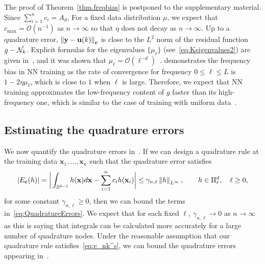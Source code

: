 \documentclass{article} %
\begin{document}
The proof of Theorem~\ref{thm.freqbias} is postponed to the supplementary material.  Since $\sum_{i=1}^n c_i = A_d$, For a fixed data distribution $\mu$, we expect that $c_{\text{max}} = \mathcal{O}(n^{-1})$ as $n\rightarrow\infty$ so that $\eta$ does not decay as $n \rightarrow \infty$. Up to a quadrature error, $\left\lVert\mathbf{y} - \mathbf{u}(k)\right\rVert_{\mathbf{c}}$ is close to the $L^2$ norm of the residual function $g - {\mathcal{N}}_k$. Explicit formulas for the eigenvalues $\{\mu_\ell\}$ (see~\cref{eq:Keigenvalues2}) are given in~\citep{basri}, and it was shown that $\mu_\ell=\mathcal{O}(\ell^{-d})$~\citep{bietti2019inductive}.  demonstrates the frequency bias in NN training as the rate of convergence for frequency $0\leq \ell\leq L$ is $1-2\eta\mu_\ell$, which is close to $1$ when $\ell$ is large.  Therefore, we expect that NN training approximates the low-frequency content of $g$ faster than its high-frequency one, which is similar to the case of training with uniform data~\citep{basri}.

\subsection{Estimating the quadrature errors}\label{sec:quaderr}
We now quantify the quadrature errors in~. If we can design a quadrature rule at the training data $\mathbf{x}_1,\ldots,\mathbf{x}_n$ such that the quadrature error satisfies 
\begin{equation}\label{eq:e_nk^s}
    \left|E_\mathbf{c}(h)\right| = \bigg|\int_{{\mathbb{S}}^{d-1}} h(\mathbf{x}) d\mathbf{x} - \sum_{i=1}^n c_i h(\mathbf{x}_i)\bigg| \leq \gamma_{n,\ell} \left\lVert h\right\rVert_{L^\infty}, \qquad h \in \Pi_{\ell}^d, \quad \ell \geq 0,
\end{equation}
for some constant $\gamma_{n,\ell} \geq 0$, then we can bound the terms in~\cref{eq:QuadratureErrors}. We expect that for each fixed $\ell$, $\gamma_{n,\ell} \rightarrow 0$ as $n \rightarrow \infty$ as this is saying that  integrals can be calculated more accurately for a large number of quadrature nodes. Under the reasonable assumption that our quadrature rule satisfies~\cref{eq:e_nk^s}, we can bound the quadrature errors appearing in~. 
\end{document}
